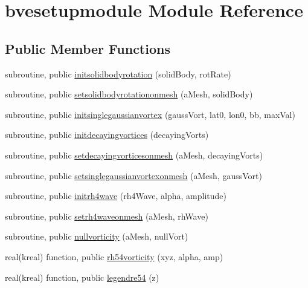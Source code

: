 \hypertarget{classbvesetupmodule}{\section{bvesetupmodule Module Reference}
\label{classbvesetupmodule}
}
\subsection*{Public Member Functions}
\begin{DoxyCompactItemize}
\item 
subroutine, public \hyperlink{classbvesetupmodule_a404d42d4256c4ee95cd66615acd80327}{initsolidbodyrotation} (solid\+Body, rot\+Rate)
\item 
subroutine, public \hyperlink{classbvesetupmodule_a371bea40a50d5521569a080ed20888c1}{setsolidbodyrotationonmesh} (a\+Mesh, solid\+Body)
\item 
subroutine, public \hyperlink{classbvesetupmodule_ab0d3794c64ea61ec7de603d2d34df782}{initsinglegaussianvortex} (gauss\+Vort, lat0, lon0, bb, max\+Val)
\item 
subroutine, public \hyperlink{classbvesetupmodule_a07b07726c8d23f6275c0c4964c15c996}{initdecayingvortices} (decaying\+Vorts)
\item 
subroutine, public \hyperlink{classbvesetupmodule_a54253e3d5e04c19be7cdb7d1bc78230d}{setdecayingvorticesonmesh} (a\+Mesh, decaying\+Vorts)
\item 
subroutine, public \hyperlink{classbvesetupmodule_a6587568121d6358d42f552a99f21bd63}{setsinglegaussianvortexonmesh} (a\+Mesh, gauss\+Vort)
\item 
subroutine, public \hyperlink{classbvesetupmodule_a359fcc2f80eee962ed020a81aa3726bd}{initrh4wave} (rh4\+Wave, alpha, amplitude)
\item 
subroutine, public \hyperlink{classbvesetupmodule_ad1f090ac113921c662e7ff8911781eae}{setrh4waveonmesh} (a\+Mesh, rh\+Wave)
\item 
subroutine, public \hyperlink{classbvesetupmodule_ae43c7d59c2b999e6af1898d5ba46c748}{nullvorticity} (a\+Mesh, null\+Vort)
\item 
real(kreal) function, public \hyperlink{classbvesetupmodule_ab67bc18bae5929b348933611bf1da37c}{rh54vorticity} (xyz, alpha, amp)
\item 
real(kreal) function, public \hyperlink{classbvesetupmodule_af9a76c172321f94070989af6cb9bb2b9}{legendre54} (z)
\end{DoxyCompactItemize}
